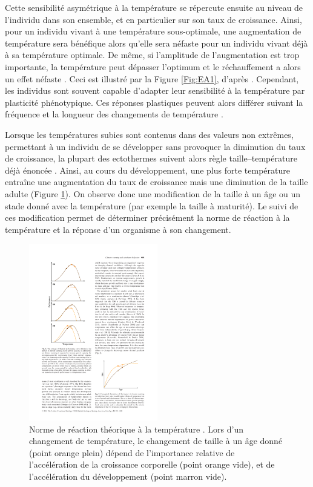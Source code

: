Cette sensibilité asymétrique à la température se répercute ensuite au niveau
de l'individu dans son ensemble, et en particulier sur son taux de croissance.
Ainsi, pour un individu vivant à une température sous-optimale, une augmentation
de température sera bénéfique alors qu'elle sera néfaste pour un individu vivant
déjà à sa température optimale. De même, si l'amplitude de l'augmentation est
trop importante, la température peut dépasser l'optimum et le réchauffement a
alors un effet néfaste . Ceci est illustré par la Figure
\ref{Fig:EA1}, d'après \textcites{ohlberger2013a}. Cependant, les individus sont
souvent capable d'adapter leur sensibilité à la température par plasticité
phénotypique. Ces réponses plastiques peuvent alors différer suivant la
fréquence et la longueur des changements de température
\autocites{angilletta2009a, huey1999a}.

Lorsque les températures subies sont contenus dans des valeurs non
extrêmes, permettant à un individu de se développer sans provoquer la diminution
du taux de croissance, la plupart des ectothermes suivent alors règle
taille--température déjà énoncée \autocite{atkinson1994a}. Ainsi, au cours du
développement, une plus forte température entraîne une augmentation du taux de
croissance mais une diminution de la taille adulte (Figure \ref{Fig:EA2}). On
observe donc une modification de la taille à un âge ou un stade donné avec la température (par
exemple la taille à maturité). Le suivi de ces modification permet de
déterminer précisément la norme de réaction à la température et la réponse d'un
organisme à son changement.

\begin{figure}[!ht] %
\centering
\includegraphics[width=0.5\textwidth]{1_CorpsDeThese/EA/Fig/ThermalNorm}
\caption[
Norme de réaction à la température]{Norme de réaction théorique à la
température \autocites[Figure 2]{ohlberger2013a}. Lors d'un changement de
température, le changement de taille à un âge donné (point orange plein) dépend
de l'importance relative de l'accélération de la croissance corporelle (point
orange vide), et de l'accélération du développement (point marron vide).}
\label{Fig:EA2}
\end{figure}

